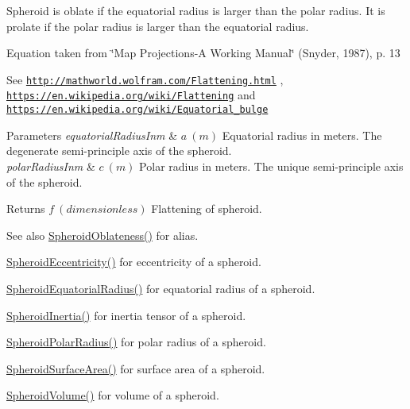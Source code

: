 Spheroid is oblate if the equatorial radius is larger than the polar radius. It is prolate if the polar radius is larger than the equatorial radius.

Equation taken from \char`\"{}\+Map Projections-\/\+A Working Manual\char`\"{} (Snyder, 1987), p. 13

See \href{http://mathworld.wolfram.com/Flattening.html}{\tt http\+://mathworld.\+wolfram.\+com/\+Flattening.\+html} , \href{https://en.wikipedia.org/wiki/Flattening}{\tt https\+://en.\+wikipedia.\+org/wiki/\+Flattening} and \href{https://en.wikipedia.org/wiki/Equatorial_bulge}{\tt https\+://en.\+wikipedia.\+org/wiki/\+Equatorial\+\_\+bulge} 
\begin{DoxyParams}{Parameters}
{\em equatorial\+Radius\+Inm} & $ a\ (m)$ Equatorial radius in meters. The degenerate semi-\/principle axis of the spheroid. \\
\hline
{\em polar\+Radius\+Inm} & $ c\ (m)$ Polar radius in meters. The unique semi-\/principle axis of the spheroid. \\
\hline
\end{DoxyParams}
\begin{DoxyReturn}{Returns}
$ f\ (dimensionless)$ Flattening of spheroid. 
\end{DoxyReturn}
\begin{DoxySeeAlso}{See also}
\mbox{\hyperlink{group___e_g_x_math-_geometry-3_d-_spheroid-_flattening_ga486adfc58b047197daf87f50b2039ca7}{Spheroid\+Oblateness()}} for alias. 

\mbox{\hyperlink{group___e_g_x_math-_geometry-3_d-_spheroid-_eccentricity_gab45680528a41bb7a5e15ddc0059156dd}{Spheroid\+Eccentricity()}} for eccentricity of a spheroid. 

\mbox{\hyperlink{group___e_g_x_math-_geometry-3_d-_spheroid-_equatorial_radius_ga1cbe564fee1b509c622d1c6d276158cd}{Spheroid\+Equatorial\+Radius()}} for equatorial radius of a spheroid. 

\mbox{\hyperlink{group___e_g_x_math-_geometry-3_d-_spheroid-_inertia_ga4a6085f1b3504bd682ee6818542ae09e}{Spheroid\+Inertia()}} for inertia tensor of a spheroid. 

\mbox{\hyperlink{group___e_g_x_math-_geometry-3_d-_spheroid-_polar_radius_gad4791a46a7efe39c63c03d2366fdd3d2}{Spheroid\+Polar\+Radius()}} for polar radius of a spheroid. 

\mbox{\hyperlink{group___e_g_x_math-_geometry-3_d-_spheroid-_surface_area_ga5a3580e7ded82cb678a558905f41ae49}{Spheroid\+Surface\+Area()}} for surface area of a spheroid. 

\mbox{\hyperlink{group___e_g_x_math-_geometry-3_d-_spheroid-_volume_ga12125484235e94b8f2580f3476b05b92}{Spheroid\+Volume()}} for volume of a spheroid. 
\end{DoxySeeAlso}
\mbox{\label{group___e_g_x_math-_geometry-3_d-_spheroid-_flattening_ga9822b6e1025edbf7d272949547c53511}} 
